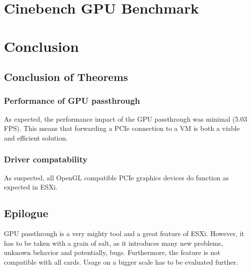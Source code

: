 \documentclass[12pt,a4paper]{report}
\begin{document}
\section{Cinebench GPU Benchmark}


\begin{comment}
 TODO: Add real benchmark for 'VM - GTX 1050 Ti'
\end{comment}

\section{Conclusion}

\subsection{Conclusion of Theorems}

\subsubsection{Performance of GPU passthrough}
As expected, the performance impact of the GPU passthrough was minimal (5.03 FPS). This means that forwarding a PCIe connection to a VM is both a viable and efficient solution.

\subsubsection{Driver compatability}
As suspected, all OpenGL compatible PCIe graphics devices do function as expected in ESXi.

\subsection{Epilogue}

GPU passthrough is a very mighty tool and a great feature of ESXi. However, it has to be taken with a grain of salt, as it introduces many new problems, unknown behavior and potentially, bugs. Furthermore, the feature is not compatible with all cards. Usage on a bigger scale has to be evaluated further.
\end{document}
